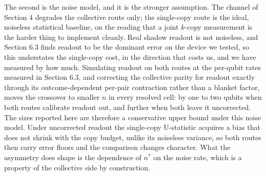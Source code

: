 %
%

The second is the noise model, and it is the stronger assumption. The
channel of Section 4 degrades the collective route only; the single-copy
route is the ideal, noiseless statistical baseline, on the reading that a
joint \(k\)-copy measurement is the harder thing to implement cleanly.
Real shadow readout is not noiseless, and Section 6.3 finds readout to be
the dominant error on the device we tested, so this understates the
single-copy cost, in the direction that costs us, and we have measured
by how much. Simulating readout on both routes at the per-qubit rates
measured in Section 6.3, and correcting the collective parity for readout
exactly through its outcome-dependent per-pair contraction rather than a
blanket factor, moves the crossover to smaller \(n\) in every resolved
cell: by one to two qubits when both routes calibrate readout out, and
further when both leave it uncorrected. The sizes reported here are
therefore a conservative upper bound under this noise model. Under
uncorrected readout the single-copy U-statistic acquires a bias that does
not shrink with the copy budget, unlike its noiseless variance, so both
routes then carry error floors and the comparison changes character. What
the asymmetry does shape is the dependence of \(n^*\) on the noise rate,
which is a property of the collective side by construction.
